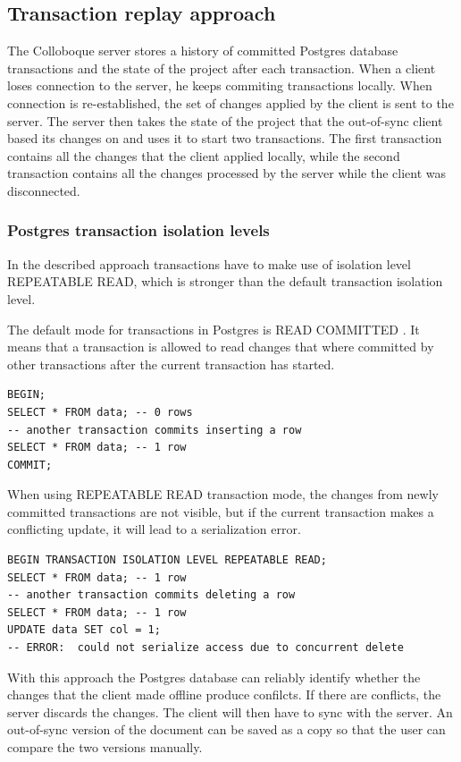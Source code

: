 \documentclass[a4paper, 11pt, oneside]{article}
\theoremstyle{definition}
\begin{document}
\subsection{Transaction replay approach}

The Colloboque server stores a history of committed Postgres database transactions and the state of the project after each transaction. When a client loses connection to the server, he keeps commiting transactions locally. When connection is re-established, the set of changes applied by the client is sent to the server. The server then takes the state of the project that the out-of-sync client based its changes on and uses it to start two transactions. The first transaction contains all the changes that the client applied locally, while the second transaction contains all the changes processed by the server while the client was disconnected. 

\subsubsection{Postgres transaction isolation levels} 
In the described approach transactions have to make use of isolation level REPEATABLE READ, which is stronger than the default transaction isolation level.

The default mode for transactions in Postgres is READ COMMITTED \cite{tisolevel}. It means that a transaction is allowed to read changes that where committed by other transactions after the current transaction has started. 

\begin{verbatim}
BEGIN;
SELECT * FROM data; -- 0 rows
-- another transaction commits inserting a row
SELECT * FROM data; -- 1 row
COMMIT;
\end{verbatim}

When using REPEATABLE READ transaction mode, the changes from newly committed transactions are not visible, but if the current transaction makes a conflicting update, it will lead to a serialization error.

\begin{verbatim}
BEGIN TRANSACTION ISOLATION LEVEL REPEATABLE READ;
SELECT * FROM data; -- 1 row
-- another transaction commits deleting a row
SELECT * FROM data; -- 1 row
UPDATE data SET col = 1;
-- ERROR:  could not serialize access due to concurrent delete
\end{verbatim}

With this approach the Postgres database can reliably identify whether the changes that the client made offline produce confilcts. If there are conflicts, the server discards the changes. The client will then have to sync with the server. An out-of-sync version of the document can be saved as a copy so that the user can compare the two versions manually.
\end{document}
